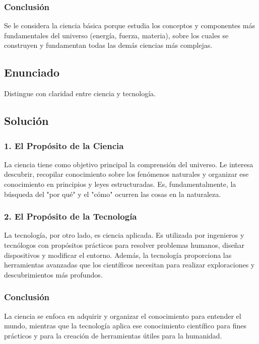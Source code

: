 \documentclass[12pt, a4paper]{article}
\begin{document}
\subsubsection*{Conclusión}
Se le considera la ciencia básica porque estudia los conceptos y componentes más fundamentales del universo (energía, fuerza, materia), sobre los cuales se construyen y fundamentan todas las demás ciencias más complejas.

\newpage

\subsection*{Enunciado}
Distingue con claridad entre ciencia y tecnología.

\subsection*{Solución}

\subsubsection*{1. El Propósito de la Ciencia}
La ciencia tiene como objetivo principal la comprensión del universo. Le interesa descubrir, recopilar conocimiento sobre los fenómenos naturales y organizar ese conocimiento en principios y leyes estructuradas. Es, fundamentalmente, la búsqueda del "por qué" y el "cómo" ocurren las cosas en la naturaleza.

\subsubsection*{2. El Propósito de la Tecnología}
La tecnología, por otro lado, es ciencia aplicada. Es utilizada por ingenieros y tecnólogos con propósitos prácticos para resolver problemas humanos, diseñar dispositivos y modificar el entorno. Además, la tecnología proporciona las herramientas avanzadas que los científicos necesitan para realizar exploraciones y descubrimientos más profundos.

\subsubsection*{Conclusión}
La ciencia se enfoca en adquirir y organizar el conocimiento para entender el mundo, mientras que la tecnología aplica ese conocimiento científico para fines prácticos y para la creación de herramientas útiles para la humanidad.
\end{document}
